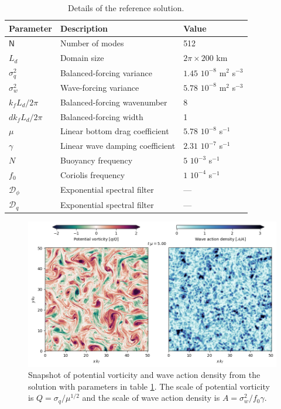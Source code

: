 \documentclass[12pt]{article}
\newcommand{\D}{\mathcal{D}}
\begin{document}
\begin{table}
 \begin{center}
   \caption{Details of the reference solution.}
   \label{parameters_reference}
   \begin{tabular}{ l | l | l }
     \hline
      Parameter & Description & Value \\
      \hline
      $\mathsf{N}$   & Number of modes &  512  \\
      $L_d$ & Domain size & $2\pi\times 200$ km \\
      $\sigma_q^2$ & Balanced-forcing variance & $1.45\,\,10^{-8}$ m$^2$ s$^{-3}$ \\
      $\sigma_w^2$ & Wave-forcing variance & $5.78\,\,10^{-8}$ m$^2$ s$^{-3}$ \\
      $k_f L_d/2\pi$    & Balanced-forcing wavenumber & 8 \\
      ${dk}_f L_d/2\pi$    & Balanced-forcing width &  1 \\
      $\mu$ & Linear bottom drag coefficient & $5.78\,\,10^{-8}$ s$^{-1}$ \\
      $\gamma$ & Linear wave damping coefficient & $2.31\,\,10^{-7}$ s$^{-1}$ \\
      $N$ & Buoyancy frequency &  $5\,\,10^{-3}$ s$^{-1}$\\
      $f_0$ & Coriolis frequency &  $1\,\,10^{-4}$ s$^{-1}$\\
      $\D_\phi$ & Exponential spectral filter & ---\\
      $\D_q$ & Exponential spectral filter & ---\\
   \end{tabular}
 \end{center}
\end{table}



\begin{figure}
\centering
\includegraphics[width=.925\textwidth]{figs/snapshots_pv_qg-niw_reference.png}
\caption{Snapshot of potential vorticity and wave action density from the solution
         with parameters in  table \ref{parameters_reference}. The scale of potential vorticity
         is $Q = \sigma_q/\mu^{1/2} $ and the scale of wave action density is
         $A = \sigma_w^2/f_0 \gamma$.}
        \label{snapshots_pv_qg-niw_reference}
\end{figure}
\end{document}
